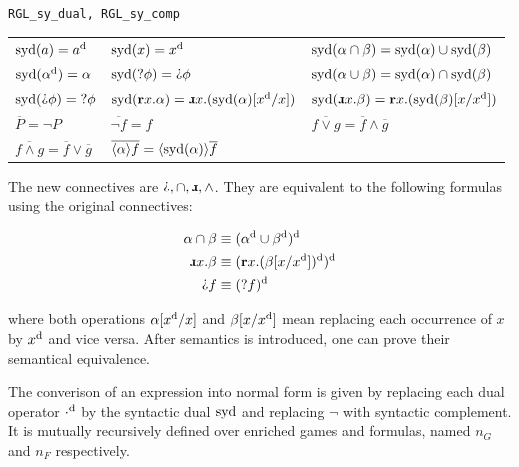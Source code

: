 \begin{bdefinition}
\texttt{RGL\_sy\_dual, RGL\_sy\_comp}

\begin{tabular}{l l l}
 $\operatorname{syd}(a)=a^\text{d}$ 
 & $\operatorname{syd}(x)=x^\text{d}$ 
 & $\operatorname{syd}(\alpha \cap \beta) = \operatorname{syd}(\alpha) \cup \operatorname{syd}(\beta)$ \\
 $\operatorname{syd}(\alpha^\text{d})=\alpha$ 
 & $\syd(\Test\phi)=\DTest\phi$ 
 & $\operatorname{syd}(\alpha\cup\beta)=\operatorname{syd}(\alpha)\cap \operatorname{syd}(\beta)$ \\
 $\syd(\DTest \phi)=\Test\phi$ & $\syd(\Rec x. \alpha) = \DRec x. (\syd(\alpha) [ \Dual{x}/x])$ & $\syd(\DRec x. \beta) = \Rec x. (\syd(\beta) [x/\Dual{x}])$

\medskip \\

 $\overline{P} = \neg P$ 
 & $\overline{\neg f} = f$ 
 & $\overline{f \vee g} = \overline{f} \wedge \overline{g}$ \\
 $\overline{f \wedge g} = \overline{f} \vee \overline{g}$
 & $\overline{\langle\alpha\rangle f} = \langle \operatorname{syd}(\alpha)\rangle \overline{f}$
\end{tabular}    
\end{bdefinition}


\medskip



The new connectives are $\DTest, \cap, \DRec, \wedge$. They are equivalent to the following formulas using the original connectives:

\begin{align*}
    \alpha \cap \beta &\equiv \Dual{(\Dual{\alpha} \cup \Dual{\beta})} \\
    \DRec x. \beta &\equiv \Dual{(\Rec x. \Dual{(\beta [x/\Dual{x}])})} \\
    \DTest f &\equiv \Dual{(\Test f)}
\end{align*}

where both operations $\alpha [x^\text{d}/x]$ and $\beta [x/x^\text{d}]$ mean replacing each occurrence of $x$ by $x^\text{d}$ and vice versa. After semantics is introduced, one can prove their semantical equivalence.

The converison of an \RGL{} expression into normal form is given by replacing each dual operator $\cdot^\text{d}$ by the syntactic dual $\operatorname{syd}$ and replacing $\neg$ with syntactic complement. It is mutually recursively defined over enriched \RGL{} games and formulas, named $n_G$ and $n_F$ respectively. 

